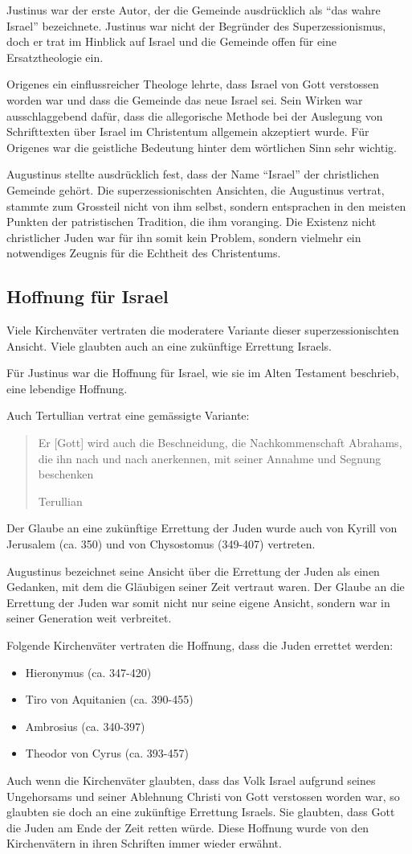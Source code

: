 \documentclass{../../inc/mybib}
\newcommand{\sz}{Superzessionismus}
\begin{document}
    Justinus war der erste Autor, der die Gemeinde ausdrücklich als \enquote{das wahre Israel} bezeichnete. Justinus war nicht der Begründer des \sz, doch er trat im Hinblick auf Israel und die Gemeinde offen für eine Ersatztheologie ein.

    Origenes ein einflussreicher Theologe lehrte, dass Israel von Gott verstossen worden war und dass die Gemeinde das neue Israel sei. Sein Wirken war ausschlaggebend dafür, dass die allegorische Methode bei der Auslegung von Schrifttexten über Israel im Christentum allgemein akzeptiert wurde. Für Origenes war die geistliche Bedeutung hinter dem wörtlichen Sinn sehr wichtig.

    Augustinus stellte ausdrücklich fest, dass der Name \enquote{Israel} der christlichen Gemeinde gehört. Die superzessionischten Ansichten, die Augustinus vertrat, stammte zum Grossteil nicht von ihm selbst, sondern entsprachen in den meisten Punkten der patristischen Tradition, die ihm voranging. Die Existenz nicht christlicher Juden war für ihn somit kein Problem, sondern vielmehr ein notwendiges Zeugnis für die Echtheit des Christentums.

    \subsection{Hoffnung für Israel}
    Viele Kirchenväter vertraten die moderatere Variante dieser superzessionischten Ansicht. Viele glaubten auch an eine zukünftige Errettung Israels.

    Für Justinus war die Hoffnung für Israel, wie sie im Alten Testament beschrieb, eine lebendige Hoffnung.

    Auch Tertullian vertrat eine gemässigte Variante:
    \blockquote[Terullian]{Er [Gott] wird auch die Beschneidung, die Nachkommenschaft Abrahams, die ihn nach und nach anerkennen, mit seiner Annahme und Segnung beschenken}

    Der Glaube an eine zukünftige Errettung der Juden wurde auch von Kyrill von Jerusalem (ca. 350) und von Chysostomus (349-407) vertreten. 

    Augustinus bezeichnet seine Ansicht über die Errettung der Juden als einen Gedanken, mit dem die Gläubigen seiner Zeit vertraut waren. Der Glaube an die Errettung der Juden war somit nicht nur seine eigene Ansicht, sondern war in seiner Generation weit verbreitet.

    Folgende Kirchenväter vertraten die Hoffnung, dass die Juden errettet werden:
    \begin{itemize}
        \item Hieronymus (ca. 347-420)
        \item Tiro von Aquitanien (ca. 390-455)
        \item Ambrosius (ca. 340-397)
        \item Theodor von Cyrus (ca. 393-457)
    \end{itemize}
    Auch wenn die Kirchenväter glaubten, dass das Volk Israel aufgrund seines Ungehorsams und seiner Ablehnung Christi von Gott verstossen worden war, so glaubten sie doch an eine zukünftige Errettung Israels. Sie glaubten, dass Gott die Juden am Ende der Zeit retten würde. Diese Hoffnung wurde von den Kirchenvätern in ihren Schriften immer wieder erwähnt.
\end{document}
